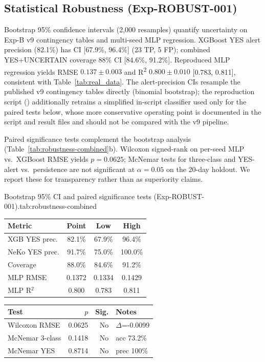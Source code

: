 \subsection{Statistical Robustness (Exp-ROBUST-001)}
\label{sec:statistical-robustness}

Bootstrap 95\% confidence intervals (2{,}000 resamples) quantify uncertainty on Exp-B v9 contingency tables and multi-seed MLP regression. XGBoost YES alert precision (82.1\%) has CI [67.9\%, 96.4\%] (23 TP, 5 FP); combined YES+UNCERTAIN coverage 88\% CI [84.6\%, 91.2\%]. Reproduced MLP regression yields RMSE $0.137 \pm 0.003$ and R\textsuperscript{2} $0.800 \pm 0.010$ [0.783, 0.811], consistent with Table~\ref{tab:real_data}. The alert-precision CIs resample the published v9 contingency tables directly (binomial bootstrap); the reproduction script () additionally retrains a simplified in-script classifier used only for the paired tests below, whose more conservative operating point is documented in the script and result files and should not be compared with the v9 pipeline.

Paired significance tests complement the bootstrap analysis (Table~\ref{tab:robustness-combined}b). Wilcoxon signed-rank on per-seed MLP vs.\ XGBoost RMSE yields $p=0.0625$; McNemar tests for three-class and YES-alert vs.\ persistence are not significant at $\alpha=0.05$ on the 20-day holdout. We report these for transparency rather than as superiority claims.

\begin{resulttable}{Bootstrap 95\% CI and paired significance tests (Exp-ROBUST-001).}{tab:robustness-combined}
\begin{minipage}[t]{0.48\linewidth}
\begin{tabular}{@{}lccc@{}}
\toprule
\textbf{Metric} & \textbf{Point} & \textbf{Low} & \textbf{High} \\
\midrule
XGB YES prec. & 82.1\% & 67.9\% & 96.4\% \\
NeKo YES prec. & 91.7\% & 75.0\% & 100.0\% \\
Coverage & 88.0\% & 84.6\% & 91.2\% \\
MLP RMSE & 0.1372 & 0.1334 & 0.1429 \\
MLP R$^2$ & 0.800 & 0.783 & 0.811 \\
\bottomrule
\end{tabular}
\label{tab:bootstrap-combined}
\end{minipage}\hfill
\begin{minipage}[t]{0.48\linewidth}
\begin{tabular}{@{}p{2.5cm}rrl@{}}
\toprule
\textbf{Test} & \textbf{$p$} & \textbf{Sig.} & \textbf{Notes} \\
\midrule
Wilcoxon RMSE & 0.0625 & No & $\Delta$=-0.0099 \\
McNemar 3-class & 0.1418 & No & acc 73.2\% \\
McNemar YES & 0.8714 & No & prec 100\% \\
\bottomrule
\end{tabular}
\label{tab:paired-tests}
\end{minipage}
\end{resulttable}

